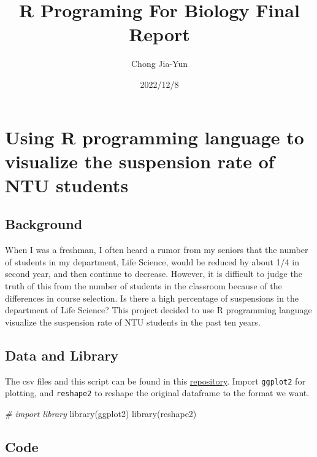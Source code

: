 \documentclass[
]{article}
\title{R Programing For Biology Final Report}
\author{Chong Jia-Yun}
\date{2022/12/8}
\newenvironment{Shaded}{\begin{snugshade}}{\end{snugshade}}
\newcommand{\CommentTok}[1]{\textcolor[rgb]{0.56,0.35,0.01}{\textit{#1}}}
\newcommand{\FunctionTok}[1]{\textcolor[rgb]{0.00,0.00,0.00}{#1}}
\newcommand{\NormalTok}[1]{#1}
\begin{document}
\maketitle

\hypertarget{using-r-programming-language-to-visualize-the-suspension-rate-of-ntu-students}{%
\section{Using R programming language to visualize the suspension rate
of NTU
students}\label{using-r-programming-language-to-visualize-the-suspension-rate-of-ntu-students}}

\hypertarget{background}{%
\subsection{Background}\label{background}}

When I was a freshman, I often heard a rumor from my seniors that the
number of students in my department, Life Science, would be reduced by
about 1/4 in second year, and then continue to decrease. However, it is
difficult to judge the truth of this from the number of students in the
classroom because of the differences in course selection. Is there a
high percentage of suspensions in the department of Life Science? This
project decided to use R programming language visualize the suspension
rate of NTU students in the past ten years.

\hypertarget{data-and-library}{%
\subsection{Data and Library}\label{data-and-library}}

The csv files and this script can be found in this
\href{https://github.com/nebula0/R_Programming_Final_Project}{repository}.
Import \texttt{ggplot2} for plotting, and \texttt{reshape2} to reshape
the original dataframe to the format we want.

\begin{Shaded}
\begin{Highlighting}[]
\CommentTok{\# import library}
\FunctionTok{library}\NormalTok{(ggplot2)}
\FunctionTok{library}\NormalTok{(reshape2)}
\end{Highlighting}
\end{Shaded}

\hypertarget{code}{%
\subsection{Code}\label{code}}
\end{document}
